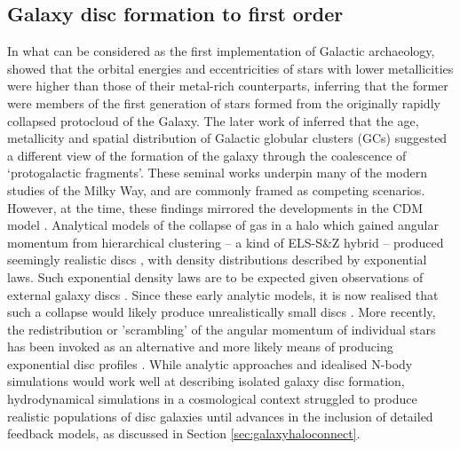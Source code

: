 \subsection{Galaxy disc formation to first order}


In what can be considered as the first implementation of Galactic archaeology, \citet[the ELS model]{1962ApJ...136..748E} showed that the orbital energies and eccentricities of stars with lower metallicities were higher than those of their metal-rich counterparts, inferring that the former were members of the first generation of stars formed from the originally rapidly collapsed protocloud of the Galaxy. The later work of \citet[the S\&Z model]{1978ApJ...225..357S} inferred that the age, metallicity and spatial distribution of Galactic globular clusters (GCs) suggested a different view of the formation of the galaxy through the coalescence of `protogalactic fragments'. These seminal works underpin many of the modern studies of the Milky Way, and are commonly framed as competing scenarios. However, at the time, these findings mirrored the developments in the CDM model \citep{1978MNRAS.183..341W}. Analytical models of the collapse of gas in a halo which gained angular momentum from hierarchical clustering -- a kind of ELS-S\&Z hybrid -- produced seemingly realistic discs \citep{1980MNRAS.193..189F}, with density distributions described by exponential laws. Such exponential density laws are to be expected given observations of external galaxy discs \citep[e.g.][]{1959HDP....53..311D,1970ApJ...160..811F,1983MNRAS.202.1025G,2006A&A...454..759P}. Since these early analytic models, it is now realised that such a collapse would likely produce unrealistically small discs \citep[e.g.][]{2000MNRAS.317..697E}. More recently, the redistribution or 'scrambling' of the angular momentum of individual stars has been invoked as an alternative and more likely means of producing exponential disc profiles \citep[e.g.][]{2013ApJ...775L..35E,2016ApJ...830..115E,2016arXiv161203171H}. While analytic approaches and idealised N-body simulations would work well at describing isolated galaxy disc formation, hydrodynamical simulations in a cosmological context struggled to produce realistic populations of disc galaxies until advances in the inclusion of detailed feedback models, as discussed in Section \ref{sec:galaxyhaloconnect}. 

